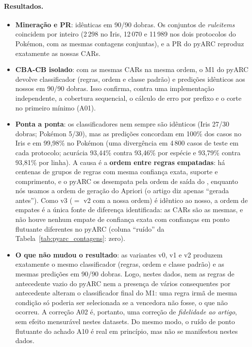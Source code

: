 \documentclass[a4paper,11pt]{article}
\newcommand{\code}[1]{\texttt{\detokenize{#1}}}
\begin{document}
\paragraph{Resultados.}
\begin{itemize}
  \item \textbf{Minera\c{c}\~ao e PR}: id\^enticas em 90/90 dobras. Os conjuntos de \emph{ruleitems} coincidem por inteiro (2\,298 no Iris, 12\,070 e 11\,989 nos dois protocolos do Pok\'emon, com as mesmas contagens conjuntas), e a PR do pyARC reproduz exatamente as nossas CARs.
  \item \textbf{CBA-CB isolado}: com as mesmas CARs na mesma ordem, o M1 do pyARC devolve classificador (regras, ordem e classe padr\~ao) e predi\c{c}\~oes id\^enticos aos nossos em 90/90 dobras. Isso confirma, contra uma implementa\c{c}\~ao independente, a cobertura sequencial, o c\'alculo de erro por prefixo e o corte no primeiro m\'inimo (A01).
  \item \textbf{Ponta a ponta}: os classificadores nem sempre s\~ao id\^enticos (Iris 27/30 dobras; Pok\'emon 5/30), mas as predi\c{c}\~oes concordam em 100\% dos casos no Iris e em 99,98\% no Pok\'emon (uma diverg\^encia em 4\,800 casos de teste em cada protocolo; acur\'acia 93,44\% contra 93,46\% por esp\'ecie e 93,79\% contra 93,81\% por linha). A causa \'e a \textbf{ordem entre regras empatadas}: h\'a centenas de grupos de regras com mesma confian\c{c}a exata, suporte e comprimento, e o pyARC os desempata pela ordem de sa\'ida do \code{pyfim}, enquanto n\'os usamos a ordem de gera\c{c}\~ao do Apriori (o artigo diz apenas ``gerada antes''). Como v3 ($=$ v2 com a nossa ordem) \'e id\^entico ao nosso, a ordem de empates \'e a \'unica fonte de diferen\c{c}a identificada: as CARs s\~ao as mesmas, e n\~ao houve nenhum empate de confian\c{c}a exata com confian\c{c}as em ponto flutuante diferentes no pyARC (coluna ``ru\'ido'' da Tabela~\ref{tab:pyarc_contagens}: zero).
  \item \textbf{O que n\~ao mudou o resultado}: as variantes v0, v1 e v2 produzem exatamente o mesmo classificador (regras, ordem e classe padr\~ao) e as mesmas predi\c{c}\~oes em 90/90 dobras. Logo, nestes dados, nem as regras de antecedente vazio do pyARC nem a presen\c{c}a de v\'arios consequentes por antecedente alteram o classificador final do M1: uma regra irm\~a de mesma condi\c{c}\~ao s\'o poderia ser selecionada se a vencedora n\~ao fosse, o que n\~ao ocorreu. A corre\c{c}\~ao A02 \'e, portanto, uma corre\c{c}\~ao de \emph{fidelidade ao artigo}, sem efeito mensur\'avel nestes datasets. Do mesmo modo, o ru\'ido de ponto flutuante do achado A10 \'e real em princ\'ipio, mas n\~ao se manifestou nestes dados.
\end{itemize}
\end{document}
